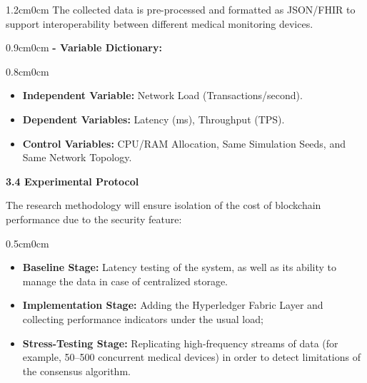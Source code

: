 \documentclass[12pt, a4paper]{report}
\begin{document}
\begin{adjustwidth}{1.2cm}{0cm}
\vspace{-1.0em} 
   The collected data is pre-processed and formatted as JSON/FHIR to support interoperability between different medical monitoring devices.
\end{adjustwidth}

\begin{adjustwidth}{0.9cm}{0cm}
  \textbf{-	Variable Dictionary:}   
\end{adjustwidth}
\begin{adjustwidth} {0.8cm}{0cm}
\vspace{-1.0em}
\begin{itemize}[nosep, topsep=0pt, partopsep=0pt]
    \item \textbf{Independent Variable:} Network Load (Transactions/second).
    \item \textbf{Dependent Variables:} Latency (ms), Throughput (TPS).
    \item \textbf{Control Variables:} CPU/RAM Allocation, Same Simulation Seeds, and Same Network Topology.
\end{itemize}
\end{adjustwidth}



\vspace{0.5cm}
{\color{myblue} \Large \bfseries 3.4 Experimental Protocol}

\noindent The research methodology will ensure isolation of the cost of blockchain performance due to the security feature:

\begin{adjustwidth} {0.5cm}{0cm}
\vspace{-1.0em}
\begin{itemize}[nosep, topsep=0pt, partopsep=0pt]
    \item \textbf{Baseline Stage:} Latency testing of the system, as well as its ability to manage the data in case of centralized storage.
    \item \textbf{Implementation Stage:} Adding the Hyperledger Fabric Layer and collecting performance indicators under the usual load;
    \item \textbf{Stress-Testing Stage:} Replicating high-frequency streams of data (for example, 50–500 concurrent medical devices) in order to detect limitations of the consensus algorithm.
\end{itemize}
\end{adjustwidth}
\end{document}
